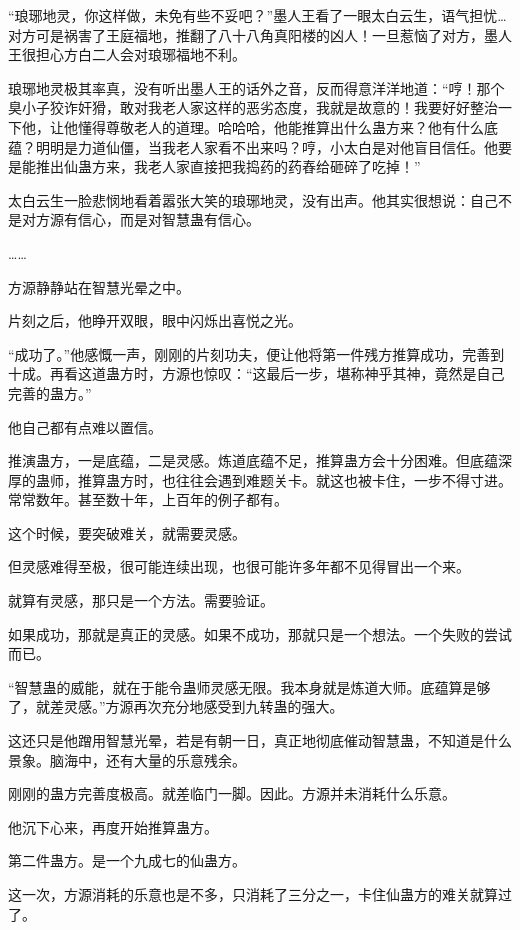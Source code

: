 
\begin{this_body}

“琅琊地灵，你这样做，未免有些不妥吧？”墨人王看了一眼太白云生，语气担忧…对方可是祸害了王庭福地，推翻了八十八角真阳楼的凶人！一旦惹恼了对方，墨人王很担心方白二人会对琅琊福地不利。

琅琊地灵极其率真，没有听出墨人王的话外之音，反而得意洋洋地道：“哼！那个臭小子狡诈奸猾，敢对我老人家这样的恶劣态度，我就是故意的！我要好好整治一下他，让他懂得尊敬老人的道理。哈哈哈，他能推算出什么蛊方来？他有什么底蕴？明明是力道仙僵，当我老人家看不出来吗？哼，小太白是对他盲目信任。他要是能推出仙蛊方来，我老人家直接把我捣药的药舂给砸碎了吃掉！”

太白云生一脸悲悯地看着嚣张大笑的琅琊地灵，没有出声。他其实很想说：自己不是对方源有信心，而是对智慧蛊有信心。

……

方源静静站在智慧光晕之中。

片刻之后，他睁开双眼，眼中闪烁出喜悦之光。

“成功了。”他感慨一声，刚刚的片刻功夫，便让他将第一件残方推算成功，完善到十成。再看这道蛊方时，方源也惊叹：“这最后一步，堪称神乎其神，竟然是自己完善的蛊方。”

他自己都有点难以置信。

推演蛊方，一是底蕴，二是灵感。炼道底蕴不足，推算蛊方会十分困难。但底蕴深厚的蛊师，推算蛊方时，也往往会遇到难题关卡。就这也被卡住，一步不得寸进。常常数年。甚至数十年，上百年的例子都有。

这个时候，要突破难关，就需要灵感。

但灵感难得至极，很可能连续出现，也很可能许多年都不见得冒出一个来。

就算有灵感，那只是一个方法。需要验证。

如果成功，那就是真正的灵感。如果不成功，那就只是一个想法。一个失败的尝试而已。

“智慧蛊的威能，就在于能令蛊师灵感无限。我本身就是炼道大师。底蕴算是够了，就差灵感。”方源再次充分地感受到九转蛊的强大。

这还只是他蹭用智慧光晕，若是有朝一日，真正地彻底催动智慧蛊，不知道是什么景象。脑海中，还有大量的乐意残余。

刚刚的蛊方完善度极高。就差临门一脚。因此。方源并未消耗什么乐意。

他沉下心来，再度开始推算蛊方。

第二件蛊方。是一个九成七的仙蛊方。

这一次，方源消耗的乐意也是不多，只消耗了三分之一，卡住仙蛊方的难关就算过了。


\end{this_body}
